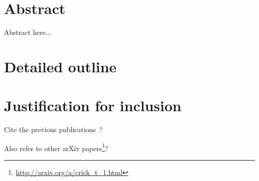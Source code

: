 \documentclass[a4paper,11pt]{article}
\begin{document}
\section*{Abstract}

Abstract here...

\section*{Detailed outline}

\section*{Justification for inclusion}

Cite the previous
publications~\cite{crick-et-al_wssspe2,crick-et-al_recomp2014,crick-et-al_jors,crick-et-al_cse2015}?

Also refer to other arXiv papers\footnote{\url{http://arxiv.org/a/crick_t_1.html}}?




\end{document}
